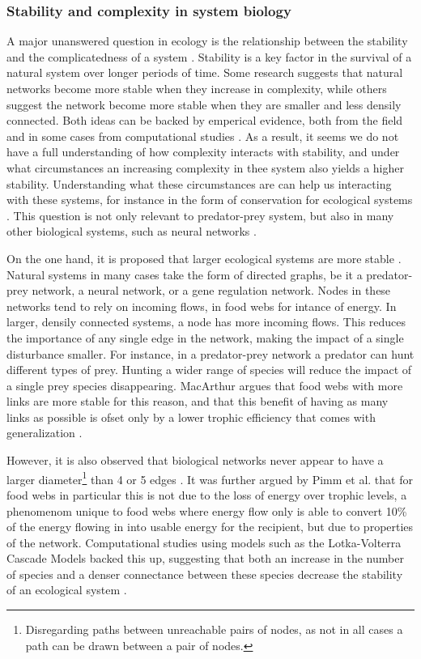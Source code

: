 \documentclass[../main.tex]{subfiles}
\begin{document}
\subsubsection{Stability and complexity in system biology}

A major unanswered question in ecology is the relationship between the stability and the complicatedness of a system \cite{macarthur1955fluctuations, pimm1977number, kondoh2003foraging}.
Stability is a key factor in the survival of a natural system over longer periods of time.
Some research suggests that natural networks become more stable when they increase in complexity, while others suggest the network become more stable when they are smaller and less densily connected.
Both ideas can be backed by emperical evidence, both from the field and in some cases from computational studies \cite{chen2001global, kondoh2003foraging}.
As a result, it seems we do not have a full understanding of how complexity interacts with stability, and under what circumstances an increasing complexity in thee system also yields a higher stability.
Understanding what these circumstances are can help us interacting with these systems, for instance in the form of conservation for ecological systems \cite{kondoh2003foraging}.
This question is not only relevant to predator-prey system, but also in many other biological systems, such as neural networks \cite{tononi1999measures}.

On the one hand, it is proposed that larger ecological systems are more stable \cite{macarthur1955fluctuations}.
Natural systems in many cases take the form of directed graphs, be it a predator-prey network, a neural network, or a gene regulation network.
Nodes in these networks tend to rely on incoming flows, in food webs for intance of energy.
In larger, densily connected systems, a node has more incoming flows.
This reduces the importance of any single edge in the network, making the impact of a single disturbance smaller.
For instance, in a predator-prey network a predator can hunt different types of prey.
Hunting a wider range of species will reduce the impact of a single prey species disappearing.
MacArthur argues that food webs with more links are more stable for this reason, and that this benefit of having as many links as possible is ofset only by a lower trophic efficiency that comes with generalization \cite{macarthur1955fluctuations}.

However, it is also observed that biological networks never appear to have a larger diameter\footnote{Disregarding paths between unreachable pairs of nodes, as not in all cases a path can be drawn between a pair of nodes.} than 4 or 5 edges \cite{pimm1977number}.
It was further argued by Pimm et al. that for food webs in particular this is not due to the loss of energy over trophic levels, a phenomenom unique to food webs where energy flow only is able to convert 10\% of the energy flowing in into usable energy for the recipient, but due to properties of the network.
Computational studies using models such as the Lotka-Volterra Cascade Models backed this up, suggesting that both an increase in the number of species and a denser connectance between these species decrease the stability of an ecological system \cite{chen2001global}.
\end{document}
